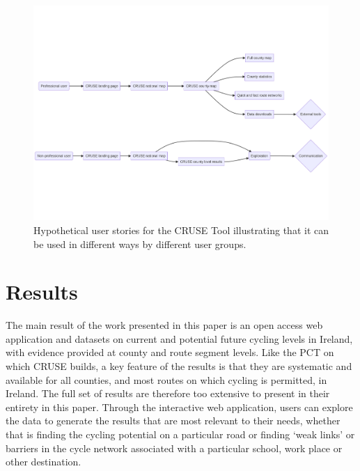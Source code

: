 \documentclass[
  super,
  preprint,
  3p]{elsarticle}
\begin{document}
\begin{figure}

{\centering 

\includegraphics{images/mermaid-figure-1.png}

}

\caption{\label{fig-user-stories}Hypothetical user stories for the CRUSE
Tool illustrating that it can be used in different ways by different
user groups.}

\end{figure}

\hypertarget{sec-results}{%
\section{Results}\label{sec-results}}

The main result of the work presented in this paper is an open access
web application and datasets on current and potential future cycling
levels in Ireland, with evidence provided at county and route segment
levels. Like the PCT on which CRUSE builds, a key feature of the results
is that they are systematic and available for all counties, and most
routes on which cycling is permitted, in Ireland. The full set of
results are therefore too extensive to present in their entirety in this
paper. Through the interactive web application, users can explore the
data to generate the results that are most relevant to their needs,
whether that is finding the cycling potential on a particular road or
finding `weak links' or barriers in the cycle network associated with a
particular school, work place or other destination.
\end{document}
